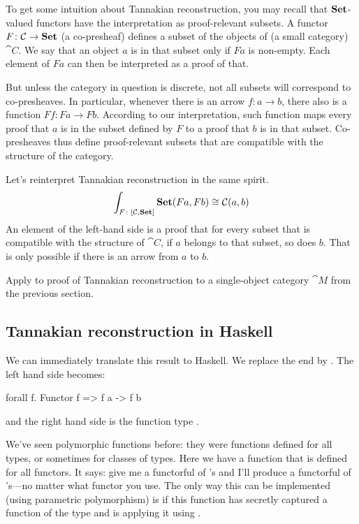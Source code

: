 \documentclass[DaoFP]{subfiles}
\begin{document}
To get some intuition about Tannakian reconstruction, you may recall that $\mathbf{Set}$-valued functors have the interpretation as proof-relevant subsets. A functor $F \colon \mathcal{C} \to \mathbf{Set}$ (a co-presheaf) defines a subset of the objects of (a small category) $\cat C$. We say that an object $a$ is in that subset only if $F a$ is non-empty. Each element of $F a$ can then be interpreted as a proof of that. 

But unless the category in question is discrete, not all subsets will correspond to co-presheaves. In particular, whenever there is an arrow $f \colon a \to b$, there also is a function $F f \colon F a \to F b$. According to our interpretation, such function maps every proof that $a$ is in the subset  defined by $F$ to a proof that $b$ is in that subset. Co-presheaves thus define proof-relevant subsets that are compatible with the structure of the category.

Let's reinterpret Tannakian reconstruction in the same spirit. 
\[ \int_{F \colon [\mathcal{C}, \mathbf{Set}]} \mathbf{Set} (F a, F b) \cong \mathcal{C}(a, b) \]
An element of the left-hand side is a proof that for every subset that is compatible with the structure of $\cat C$, if $a$ belongs to that subset, so does $b$. That is only possible if there is an arrow from $a$ to $b$. 

\begin{exercise}
Apply to proof of Tannakian reconstruction to a single-object category $\cat M$ from the previous section.
\end{exercise}

\subsection{Tannakian reconstruction in Haskell}

We can immediately translate this result to Haskell. We replace the end by . The left hand side becomes:
\begin{haskell}
forall f. Functor f => f a -> f b
\end{haskell}
and the right hand side is the function type . 

We've seen polymorphic functions before: they were functions defined for all types, or sometimes for classes of types. Here we have a function that is defined for all functors. It says: give me a functorful of 's and I'll produce a functorful of 's---no matter what functor you use. The only way this can be implemented (using parametric polymorphism) is if this function has secretly captured a function of the type  and is applying it using . 
\end{document}
